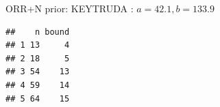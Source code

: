 \begin{frame}[fragile]{ORR+N prior: KEYTRUDA : \(a=42.1, b=133.9\)}
\begin{verbatim}
##    n bound
## 1 13     4
## 2 18     5
## 3 54    13
## 4 59    14
## 5 64    15
\end{verbatim}

\begin{Shaded}
\begin{Highlighting}[]
\NormalTok{(}\NormalTok{, }\NormalTok{, }  \NormalTok{, } \NormalTok{, } \NormalTok{)}
\NormalTok{(}\NormalTok{, }\NormalTok{, }  \NormalTok{, } \NormalTok{, } \NormalTok{)}
\end{Highlighting}
\end{Shaded}

\end{frame}

